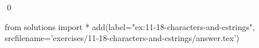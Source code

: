 
\begin{ex}
  \label{ex:11-18-characters-and-cstrings}
  
  \qed
\end{ex}
\begin{python0}
from solutions import *
add(label="ex:11-18-characters-and-cstrings",
    srcfilename='exercises/11-18-characters-and-cstrings/answer.tex')
\end{python0}
